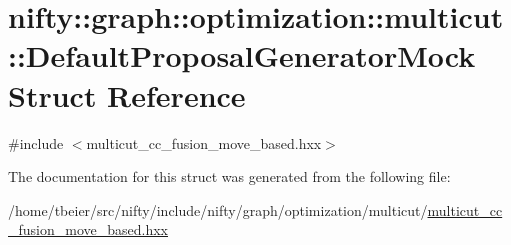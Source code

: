 \hypertarget{structnifty_1_1graph_1_1optimization_1_1multicut_1_1DefaultProposalGeneratorMock}{}\section{nifty\+:\+:graph\+:\+:optimization\+:\+:multicut\+:\+:Default\+Proposal\+Generator\+Mock Struct Reference}
\label{structnifty_1_1graph_1_1optimization_1_1multicut_1_1DefaultProposalGeneratorMock}


{\ttfamily \#include $<$multicut\+\_\+cc\+\_\+fusion\+\_\+move\+\_\+based.\+hxx$>$}



The documentation for this struct was generated from the following file\+:\begin{DoxyCompactItemize}
\item 
/home/tbeier/src/nifty/include/nifty/graph/optimization/multicut/\hyperlink{multicut__cc__fusion__move__based_8hxx}{multicut\+\_\+cc\+\_\+fusion\+\_\+move\+\_\+based.\+hxx}\end{DoxyCompactItemize}
